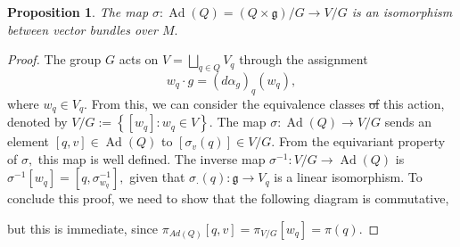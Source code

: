 \documentclass[12pt, letterpaper, reqno]{amsart}
\theoremstyle{definition}
\theoremstyle{plain}
\newtheorem{prop}{Proposition}
\theoremstyle{remark}
\providecommand{\DIFadd}[1]{{\protect\color{blue}\uwave{#1}}} %
\providecommand{\DIFdel}[1]{{\protect\color{red}\sout{#1}}}                      %
\providecommand{\DIFaddbegin}{} %
\providecommand{\DIFaddend}{} %
\providecommand{\DIFdelbegin}{} %
\providecommand{\DIFdelend}{} %
\newcommand{\DIFscaledelfig}{0.5}
\newlength{\DIFdelgraphicswidth} %
\newlength{\DIFdelgraphicsheight} %
\newcommand{\DIFaddincludegraphics}[2][]{{\color{blue}\fbox{\DIFOincludegraphics[#1]{#2}}}} %
\newcommand{\DIFdelincludegraphics}[2][]{%
\sbox{\DIFdelgraphicsbox}{\DIFOincludegraphics[#1]{#2}}%
\settoboxwidth{\DIFdelgraphicswidth}{\DIFdelgraphicsbox} %
\settoboxtotalheight{\DIFdelgraphicsheight}{\DIFdelgraphicsbox} %
\scalebox{\DIFscaledelfig}{%
\parbox[b]{\DIFdelgraphicswidth}{\usebox{\DIFdelgraphicsbox}\\[-\baselineskip] \rule{\DIFdelgraphicswidth}{0em}}\llap{\resizebox{\DIFdelgraphicswidth}{\DIFdelgraphicsheight}{%
\setlength{\unitlength}{\DIFdelgraphicswidth}%
\begin{picture}(1,1)%
\thicklines\linethickness{2pt} %
{\color[rgb]{1,0,0}\put(0,0){\framebox(1,1){}}}%
{\color[rgb]{1,0,0}\put(0,0){\line( 1,1){1}}}%
{\color[rgb]{1,0,0}\put(0,1){\line(1,-1){1}}}%
\end{picture}%
}\hspace*{3pt}}} %
} %
\DeclareRobustCommand{\DIFaddbegin}{\DIFOaddbegin \let\includegraphics\DIFaddincludegraphics} %
\DeclareRobustCommand{\DIFaddend}{\DIFOaddend \let\includegraphics\DIFOincludegraphics} %
\DeclareRobustCommand{\DIFdelbegin}{\DIFOdelbegin \let\includegraphics\DIFdelincludegraphics} %
\DeclareRobustCommand{\DIFdelend}{\DIFOaddend \let\includegraphics\DIFOincludegraphics} %
\begin{document}
\begin{prop}\label{prop:isomorphism_vb}
	The map $ \sigma: \operatorname{Ad} (Q) = (Q\times \mathfrak{g})/G \rightarrow V/G $ is an isomorphism between vector bundles over $ M. $ 
\end{prop}
\begin{proof}
	The group $ G $ acts on $ V = \bigsqcup_{q\in Q}V_q $ through the assignment $$ w_q\cdot g = (d\alpha_g)_q(w_q), $$ 
	where $ w_q\in V_q. $ From this, we can consider the equivalence classes \DIFdelbegin \DIFdel{of }\DIFdelend \DIFaddbegin \DIFadd{associated to }\DIFaddend this action, denoted by $ V/G:= \left\{ [w_q]: w_q\in V \right\}.  $ The map $ \sigma: \operatorname{Ad} (Q) \rightarrow V/G $ sends an element $ [q,v]\in \operatorname{Ad} (Q) $ to $ [\sigma_v(q)]\in V/G. $ From the equivariant property of $ \sigma, $ this map is well defined. The inverse map $ \sigma^{-1} : V/G \rightarrow \operatorname{Ad}(Q) $ is $ \sigma^{-1}[w_q] = [q,\sigma^{-1}_{w_q}], $ given that $ \sigma_\cdot(q): \mathfrak{g}\rightarrow V_q $ is a linear isomorphism. To conclude this proof, we need to show that the following diagram is commutative,
	\begin{center}
	\end{center}
	but this is immediate, since $ \pi_{Ad(Q)}[q,v]=\pi_{V/G}[w_q]=\pi(q). $ 
\end{proof}
\end{document}
